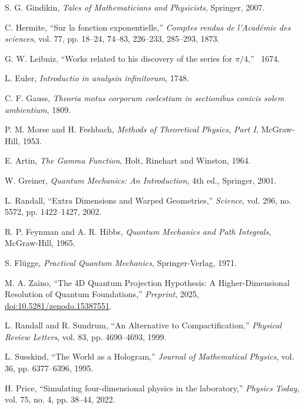 \documentclass[12pt,a4paper]{article}
\begin{document}
\begin{thebibliography}{99}
S. G. Gindikin, \emph{Tales of Mathematicians and Physicists}, Springer, 2007. 

C. Hermite, “Sur la fonction exponentielle,” \emph{Comptes rendus de l'Académie des sciences}, vol. 77, pp. 18–24, 74–83, 226–233, 285–293, 1873.

G. W. Leibniz, “Works related to his discovery of the series for $\pi/4$,” ~1674. 

L. Euler, \emph{Introductio in analysin infinitorum}, 1748. 

C. F. Gauss, \emph{Theoria motus corporum coelestium in sectionibus conicis solem ambientium}, 1809. 

P. M. Morse and H. Feshbach, \emph{Methods of Theoretical Physics, Part I}, McGraw-Hill, 1953. 

E. Artin, \emph{The Gamma Function}, Holt, Rinehart and Winston, 1964.

W. Greiner, \emph{Quantum Mechanics: An Introduction}, 4th ed., Springer, 2001. 

L. Randall, “Extra Dimensions and Warped Geometries,” \emph{Science}, vol. 296, no. 5572, pp. 1422–1427, 2002. 

R. P. Feynman and A. R. Hibbs, \emph{Quantum Mechanics and Path Integrals}, McGraw-Hill, 1965.

S. Flügge, \emph{Practical Quantum Mechanics}, Springer-Verlag, 1971. 

M. A. Zaino, “The 4D Quantum Projection Hypothesis: A Higher-Dimensional Resolution of Quantum Foundations,” \emph{Preprint}, 2025, \href{https://doi.org/10.5281/zenodo.15387551}{doi:10.5281/zenodo.15387551}.

L. Randall and R. Sundrum, “An Alternative to Compactification,” \emph{Physical Review Letters}, vol. 83, pp. 4690–4693, 1999.

L. Susskind, “The World as a Hologram,” \emph{Journal of Mathematical Physics}, vol. 36, pp. 6377–6396, 1995.

H. Price, “Simulating four-dimensional physics in the laboratory,” \emph{Physics Today}, vol. 75, no. 4, pp. 38–44, 2022.


\end{thebibliography}
\end{document}
